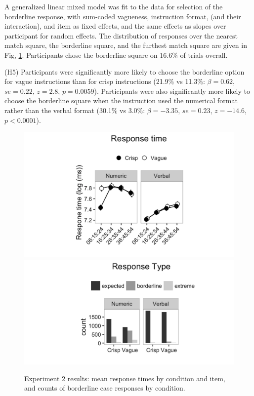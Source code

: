 \documentclass[%
man,		%
floatsintext,%
apacite%
]{apa6}
\begin{document}
A generalized linear mixed model \cite{jaeger2008categorical} was fit to the data for selection of the borderline response, with sum-coded vagueness, instruction format, (and their interaction), and item as fixed effects, and the same effects as slopes over participant for random effects. The distribution of responses over the nearest match square, the borderline square, and the furthest match square are given in Fig, \ref{resultse2}. Participants chose the borderline square on $16.6\%$ of trials overall.
{\small 
\begin{APAenumerate}
	\item [(H5)] Participants were significantly more likely to choose the borderline option for vague instructions than for crisp instructions (21.9\% vs 11.3\%: $\beta=0.62$, $se=0.22$, $z=2.8$, $p=0.0059$). Participants were also significantly more likely to choose the borderline square when the instruction used the numerical format rather than the verbal format (30.1\% vs 3.0\%: $\beta=-3.35$, $se=0.23$, $z=-14.6$, $p<0.0001$). 
\end{APAenumerate}
}

\begin{figure}[htbp]
\centering
\includegraphics[trim = 0mm 0mm 0mm 0mm, clip, width=.49\textwidth]{images/e2rt.pdf}
\includegraphics[trim = 0mm -23mm 0mm 0mm, clip, width=.49\textwidth]{images/e2bl.pdf}
\caption{Experiment 2 results: mean response times by condition and item, and counts of borderline case responses by condition.}
\label{resultse2}
\end{figure}
\end{document}
